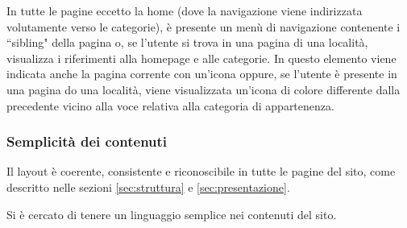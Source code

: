 In tutte le pagine eccetto la home (dove la navigazione viene indirizzata
volutamente verso le categorie), è presente un menù di navigazione contenente
i ``sibling" della pagina o, se l'utente si trova in una pagina di una
località, visualizza i riferimenti alla homepage e alle categorie.
In questo elemento viene indicata anche la pagina corrente con un'icona
oppure, se l'utente è presente in una pagina do una località, viene
visualizzata un'icona di colore differente dalla precedente vicino alla
voce relativa alla categoria di appartenenza.

\subsubsection{Semplicità dei contenuti}
Il layout è coerente, consistente e riconoscibile in tutte le pagine del sito,
come descritto nelle sezioni \ref{sec:struttura} e \ref{sec:presentazione}.

Si è cercato di tenere un linguaggio semplice nei contenuti del sito.
